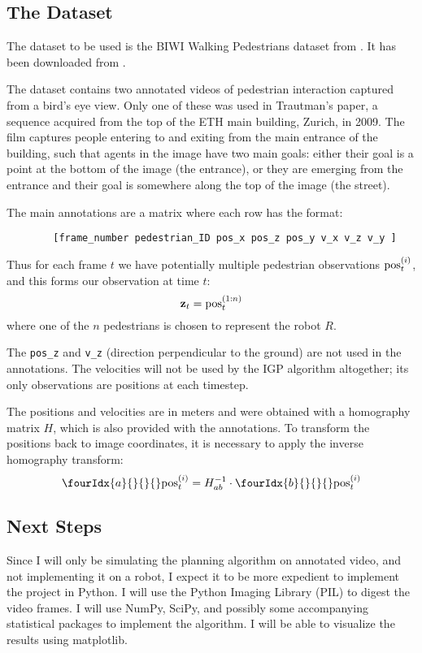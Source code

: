 \documentclass[a4paper,11pt,headings=small]{article}
\begin{document}
\subsection*{The Dataset}
\quad The dataset to be used is the BIWI Walking Pedestrians dataset from \cite{Pellegrini2009}. It has been downloaded from \cite{dataset}.

The dataset contains two annotated videos of pedestrian interaction captured from a bird's eye view. Only one of these was used in Trautman's paper, a sequence acquired from the top of the ETH main building, Zurich, in 2009. The film captures people entering to and exiting from the main entrance of the building, such that agents in the image have two main goals: either their goal is a point at the bottom of the image (the entrance), or they are emerging from the entrance and their goal is somewhere along the top of the image (the street).

The main annotations are a matrix where each row has the format:
\begin{verbatim}
        [frame_number pedestrian_ID pos_x pos_z pos_y v_x v_z v_y ]
\end{verbatim}

Thus for each frame $t$ we have potentially multiple pedestrian observations $\mathrm{pos}^{(i)}_t$, and this forms our observation at time $t$:
$$ \mathbf{z}_t = \mathrm{pos}^{(1:n)}_t $$
where one of the $n$ pedestrians is chosen to represent the robot $R$.

The \texttt{pos\_z} and \texttt{v\_z} (direction perpendicular to the ground) are not used in the annotations. The velocities will not be used by the IGP algorithm altogether; its only observations are positions at each timestep.

The positions and velocities are in meters and were obtained with a homography matrix $H$, which is also provided with the annotations. To transform the positions back to image coordinates, it is necessary to apply the inverse homography transform:
$$ \fourIdx{a}{}{}{}\post = H_{ab}^{-1} \cdot \fourIdx{b}{}{}{}\post $$

\subsection*{Next Steps}
\quad Since I will only be simulating the planning algorithm on annotated video, and not implementing it on a robot, I expect it to be more expedient to implement the project in Python. I will use the Python Imaging Library (PIL) to digest the video frames. I will use NumPy, SciPy, and possibly some accompanying statistical packages to implement the algorithm. I will be able to visualize the results using matplotlib.
\end{document}

